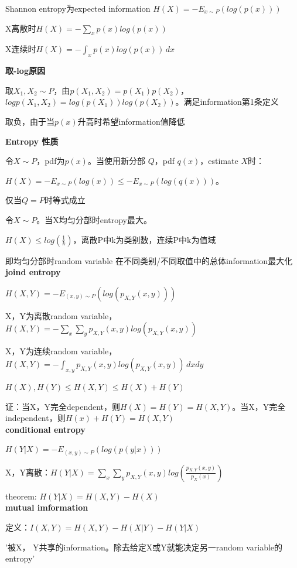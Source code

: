 \documentclass[UTF8]{ctexart}
\begin{document}
  Shannon entropy为expected information $H(X) = -E_{x \sim P}(log(p(x)))$

  \quad X离散时$H(X) = - \sum_{x} p(x)log(p(x))$

  \quad X连续时$H(X) = -\int_{x} p(x)log(p(x)) \,dx $
  
  \textbf{取-log原因}
  
  \quad 取$X_1, X_2 \sim P$，由$p(X_1, X_2) = p(X_1)p(X_2)$，$logp(X_1, X_2) = log(p(X_1))log(p(X_2))$。满足information第1条定义
  
  \quad 取负，由于当$p(x)$升高时希望information值降低

  \textbf{Entropy 性质}

  \quad 令$X \sim P$，pdf为$p(x)$。当使用新分部 $Q$，pdf $q(x)$，estimate $X$时：

  \quad \quad $H(X) = -E_{x \sim P}(log(x)) \leq -E_{x \sim P}(log(q(x)))$。

  \quad \quad 仅当$Q = P$时等式成立

  \quad 令$X \sim P$。当X均匀分部时entropy最大。

  \quad \quad $H(X) \leq log(\frac{1}{k})$，离散P中k为类别数，连续P中k为值域

  \quad \quad 即均匀分部时random variable 在不同类别/不同取值中的总体information最大化\\
\textbf{joind entropy}

  $H(X, Y) = -E_{(x, y) \sim P}(log(p_{X, Y}(x, y)))$

  X，Y为离散random variable，$H(X, Y) = -\sum_x\sum_yp_{X, Y}(x, y)log(p_{X, Y}(x, y))$

  X，Y为连续random variable，$H(X, Y) = -\int_{x, y} p_{X, Y}(x, y)log(p_{X, Y}(x, y)) \,dxdy$

  $H(X), H(Y) \leq H(X, Y) \leq H(X) + H(Y)$
  
  \quad 证：当X，Y完全dependent，则$H(X) = H(Y) = H(X, Y)$。当X，Y完全independent，则$H(x) + H(Y) = H(X, Y)$\\
\textbf{conditional entropy}

  $H(Y | X) = -E_{(x, y) \sim P}(log(p(y | x)))$

  X，Y离散：$H(Y | X) = \sum_x\sum_yp_{X, Y}(x, y)log(\frac{p_{X, Y}(x, y)}{p_X(x)})$

  theorem: $H(Y | X) = H(X, Y) - H(X)$\\
\textbf{mutual imformation}

  定义：$I(X, Y) = H(X, Y) - H(X | Y) - H(Y | X)$

  \quad '被X， Y共享的information。除去给定X或Y就能决定另一random variable的entropy'
\end{document}
